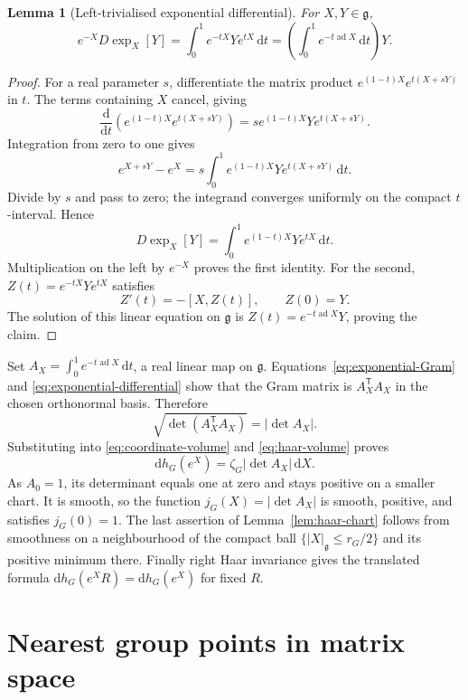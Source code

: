 \documentclass[11pt,reqno]{amsart}
\numberwithin{equation}{section}
\newtheorem{lemma}[theorem]{Lemma}
\theoremstyle{definition}
\theoremstyle{remark}
\newcommand{\dd}{\mathrm d}
\newcommand{\g}{\mathfrak g}
\DeclareMathOperator{\ad}{ad}
\begin{document}
\begin{lemma}[Left-trivialised exponential differential]
\label{lem:exp-differential}
For \(X,Y\in\g\),
\begin{equation}
     e^{-X}D\exp_X[Y]
        =\int_0^1e^{-tX}Ye^{tX}\,\dd t
        =\left(\int_0^1e^{-t\ad X}\,\dd t\right)Y.
 \label{eq:exponential-differential}
\end{equation}
\end{lemma}
\begin{proof}
For a real parameter \(s\), differentiate the matrix product
\(e^{(1-t)X}e^{t(X+sY)}\) in \(t\). The terms containing \(X\)
cancel, giving
\[
 \frac{\dd}{\dd t}\left(e^{(1-t)X}e^{t(X+sY)}\right)
                     =s e^{(1-t)X}Ye^{t(X+sY)}.
\]
Integration from zero to one gives
\[
     e^{X+sY}-e^X=s\int_0^1e^{(1-t)X}Ye^{t(X+sY)}\,\dd t.
\]
Divide by \(s\) and pass to zero; the integrand converges uniformly
on the compact \(t\)-interval. Hence
\[
               D\exp_X[Y]=\int_0^1e^{(1-t)X}Ye^{tX}\,\dd t.
\]
Multiplication on the left by \(e^{-X}\) proves the first identity.
For the second, \(Z(t)=e^{-tX}Ye^{tX}\) satisfies
\[
                         Z'(t)=-[X,Z(t)],\qquad Z(0)=Y.
\]
The solution of this linear equation on \(\g\) is
\(Z(t)=e^{-t\ad X}Y\), proving the claim.
\end{proof}

Set \(A_X=\int_0^1e^{-t\ad X}\,\dd t\), a real linear map
on \(\g\). Equations~\eqref{eq:exponential-Gram} and
\eqref{eq:exponential-differential} show that the Gram matrix is
\(A_X^{\mathsf T}A_X\) in the chosen orthonormal basis. Therefore
\[
                 \sqrt{\det(A_X^{\mathsf T}A_X)}=|\det A_X|.
\]
Substituting into \eqref{eq:coordinate-volume} and
\eqref{eq:haar-volume} proves
\[
          \dd h_G(e^X)=\zeta_G|\det A_X|\,\dd X.
\]
As \(A_0=1\), its determinant equals one at zero and stays
positive on a smaller chart. It is smooth, so the function
\(j_G(X)=|\det A_X|\) is smooth, positive, and satisfies
\(j_G(0)=1\). The last assertion of Lemma~\ref{lem:haar-chart}
follows from smoothness on a neighbourhood of the compact ball
\(\{|X|_{\g}\le r_G/2\}\) and its positive minimum there.
Finally right Haar invariance gives the translated formula
\(\dd h_G(e^XR)=\dd h_G(e^X)\) for fixed \(R\).

\section{Nearest group points in matrix space}
\label{app:projection}
\end{document}
